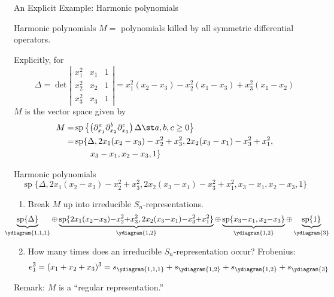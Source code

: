 \documentclass[dvipsnames]{beamer}
\renewcommand{\Span}{\operatorname{sp}}
\theoremstyle{definition}
\newcounter{c}
\begin{document}
\begin{frame}{An Explicit Example: Harmonic polynomials}
  \begin{block}{Harmonic polynomials}
   \(M =\) polynomials killed by all symmetric differential
   operators.
  \end{block}\pause
  Explicitly, for
   \[
     \Delta = \det \left|
       \begin{matrix}
         x_1^2 & x_1 & 1\\
         x_2^2 & x_2 & 1\\
         x_3^2 & x_3 & 1
       \end{matrix}
     \right| = x_1^2(x_2-x_3) - x_2^2 (x_1 - x_3) + x_3^2(x_1-x_2)
   \]\pause
   \(M\) is the vector space given by\pause
   \begin{align*}
       M  = & \Span\left\{
\left(           \partial_{x_1}^a
           \partial_{x_2}^b  \partial_{x_3}^c
\right)         \Delta \st a,b,c \geq 0\right\} \\
        = & \Span\{\Delta, 2x_1(x_2-x_3)-x_2^2+x_3^2,
            2x_2(x_3-x_1)-x_3^2+x_1^2, \\
       & \phantom{\Span\{\}}x_3-x_1, x_2-x_3,1\}
   \end{align*}
\end{frame}
\begin{frame}{Harmonic polynomials}
\[
\Span\{\Delta, 2x_1(x_2-x_3)-x_2^2+x_3^2,
            2x_2(x_3-x_1)-x_3^2+x_1^2, 
       x_3-x_1, x_2-x_3,1\}
  \]\pause 
  \begin{enumerate}
\item Break \(M\) up into irreducible \(S_n\)-representations. \pause
  \[
    \hspace{-2.9em}
    \scalebox{0.95}{\(
      \underbrace{\Span\{\Delta\}}_{\ydiagram{1,1,1}} {\oplus} \underbrace{\Span\{2x_1(x_2{-}x_3){-}x_2^2{+}x_3^2,
        2x_2(x_3{-}x_1){-}x_3^2{+}x_1^2\}}_{\ydiagram{1,2}} {\oplus}
      \underbrace{\Span\{x_3{-}x_1, x_2{-}x_3\}}_{\ydiagram{1,2}} {\oplus} \underbrace{\Span\{1\}}_{\ydiagram{3}}\)}
  \]\pause
  \item How many times does an irreducible \(S_n\)-representation occur? \pause
    Frobenius: \pause
    \[
      e_1^3 = (x_1+x_2+x_3)^3 = s_{\ydiagram{1,1,1}} + s_{\ydiagram{1,2}} +
      s_{\ydiagram{1,2}} + s_{\ydiagram{3}}
    \]
  \end{enumerate}
  \pause
  Remark: \(M\) is a
  ``regular representation.''
\end{frame}
\end{document}
